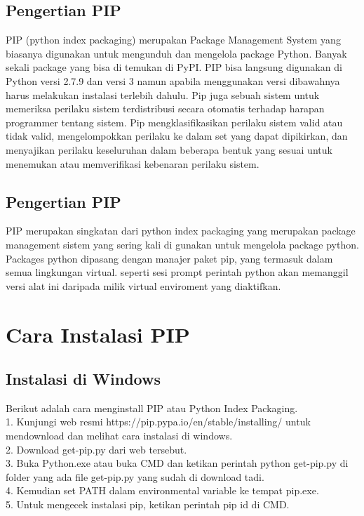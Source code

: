 \documentclass[12pt,a4paper]{article}
\begin{document}
\subsection{Pengertian PIP}
PIP (python index packaging) merupakan Package Management System yang biasanya digunakan untuk mengunduh dan mengelola package Python. Banyak sekali package yang bisa di temukan di PyPI. 
PIP bisa langsung digunakan di Python versi 2.7.9 dan versi 3 namun apabila menggunakan versi dibawahnya harus melakukan instalasi terlebih dahulu. 
Pip juga sebuah sistem untuk memeriksa perilaku sistem terdistribusi secara otomatis terhadap harapan programmer tentang sistem. Pip mengklasifikasikan perilaku sistem valid atau tidak valid, mengelompokkan perilaku ke dalam set yang dapat dipikirkan, dan menyajikan perilaku keseluruhan dalam beberapa bentuk yang sesuai untuk menemukan atau memverifikasi kebenaran perilaku sistem.
\subsection{Pengertian PIP}
PIP merupakan singkatan dari python index packaging yang merupakan package management sistem yang sering kali di gunakan untuk mengelola package python. Packages python dipasang dengan manajer paket pip, yang termasuk dalam semua lingkungan virtual. seperti sesi prompt perintah python akan memanggil versi alat ini daripada milik virtual enviroment yang diaktifkan.

\section{Cara Instalasi PIP}
\subsection{Instalasi di Windows}
Berikut adalah cara menginstall PIP atau Python Index Packaging. \\
1.	Kunjungi web resmi https://pip.pypa.io/en/stable/installing/ untuk mendownload dan melihat cara instalasi di windows.\\
2.	Download get-pip.py dari web tersebut. \\
3.	Buka Python.exe atau buka CMD dan ketikan perintah python get-pip.py di folder yang ada file get-pip.py yang sudah di 	download tadi.\\
4.	Kemudian set PATH dalam environmental variable ke tempat pip.exe. \\
5.	Untuk mengecek instalasi pip, ketikan perintah pip id di CMD. \\
\end{document}

